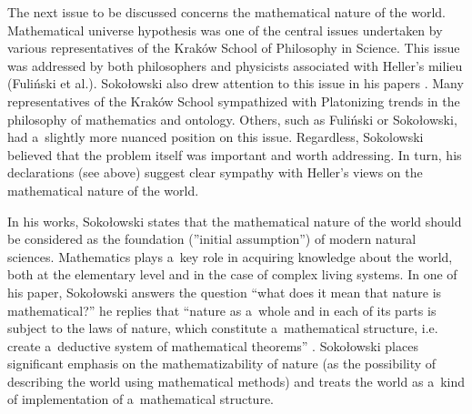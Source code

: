 \documentclass[%
  manuscript=article,
  year=2024,
  volume=77,
  doi=10.59203/zfn.77.689,
]{zfn}
\begin{document}
The next issue to be discussed concerns the mathematical nature of the world. Mathematical universe hypothesis was one of the central issues undertaken by various representatives of the Kraków School of Philosophy in Science. This issue was addressed by both philosophers and physicists associated with Heller's milieu (Fuliński et al.). Sokołowski also drew attention to this issue in his papers 
\parencites[see e.g,][]{Sokoowski1987Alberta}[][]{Sokoowski1990Nadwyzkowosc}[][]{Sokoowski2011Pare}[][]{Sokoowski2015Co}. %
 Many representatives of the Kraków School sympathized with Platonizing trends in the philosophy of mathematics and ontology. Others, such as Fuliński or Sokołowski, had a~slightly more nuanced position on this issue. Regardless, Sokolowski believed that the problem itself was important and worth addressing. In turn, his declarations (see above) suggest clear sympathy with Heller's views on the mathematical nature of the world.



In his works, Sokołowski states that the mathematical nature of the world should be considered as the foundation (''initial assumption'') of modern natural sciences. Mathematics plays a~key role in acquiring knowledge about the world, both at the elementary level and in the case of complex living systems. In one of his paper, Sokołowski answers the question ``what does it mean that nature is mathematical?'' he replies that ``nature as a~whole and in each of its parts is subject to the laws of nature, which constitute a~mathematical structure, i.e. create a~deductive system of mathematical theorems''
\parencite[][]{Sokoowski1990Nadwyzkowosc}. %
 Sokołowski places significant emphasis on the mathematizability of nature (as the possibility of describing the world using mathematical methods) and treats the world as a~kind of implementation of a~mathematical structure.
\end{document}
